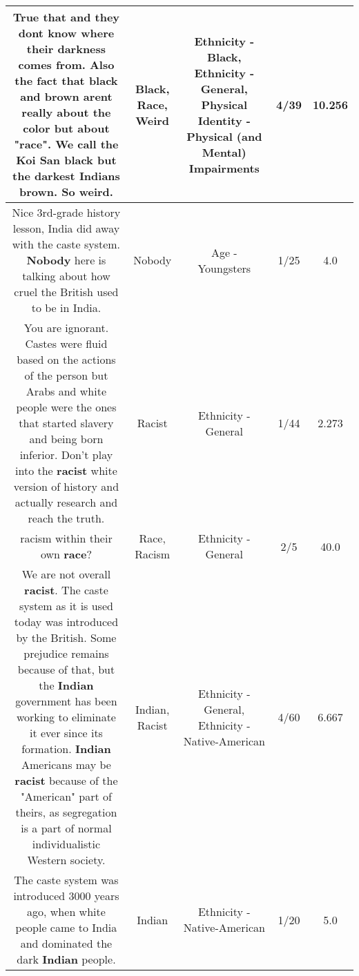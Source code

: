 \documentclass[11pt]{article}
\newlength\mylength
\begin{document}
\begin{center}
\begin{longtable}{|C{.65\mylength}|C{.30\mylength}|C{.12\mylength}|C{.12\mylength}|C{.12\mylength}|}
  \small True that and they dont know where their darkness comes from. Also the fact that \textbf{black} and brown arent really about the color but about "\textbf{race}". We call the Koi San \textbf{black} but the darkest Indians brown. So \textbf{weird}.\normalsize   & Black, Race, Weird & Ethnicity - Black, Ethnicity - General, Physical Identity - Physical (and Mental) Impairments & 4/39 & 10.256 \\  \hline
  \small Nice 3rd-grade history lesson, India did away with the caste system. \textbf{Nobody} here is talking about how cruel the British used to be in India.\normalsize   & Nobody & Age - Youngsters & 1/25 & 4.0 \\  \hline
  \small You are ignorant. Castes were fluid based on the actions of the person but Arabs and white people were the ones that started slavery and being born inferior. Don't play into the \textbf{racist} white version of history and actually research and reach the truth.\normalsize   & Racist & Ethnicity - General & 1/44 & 2.273 \\  \hline
  \small racism within their own \textbf{race}?\normalsize   & Race, Racism & Ethnicity - General & 2/5 & 40.0 \\  \hline
  \small We are not overall \textbf{racist}. The caste system as it is used today was introduced by the British. Some prejudice remains because of that, but the \textbf{Indian} government has been working to eliminate it ever since its formation. \textbf{Indian} Americans may be \textbf{racist} because of the "American" part of theirs, as segregation is a part of normal individualistic Western society.\normalsize   & Indian, Racist & Ethnicity - General, Ethnicity - Native-American & 4/60 & 6.667 \\  \hline
  \small The caste system was introduced 3000 years ago, when white people came to India and dominated the dark \textbf{Indian} people.\normalsize   & Indian & Ethnicity - Native-American & 1/20 & 5.0 \\  \hline

\end{longtable}
\end{center}
\end{document}
